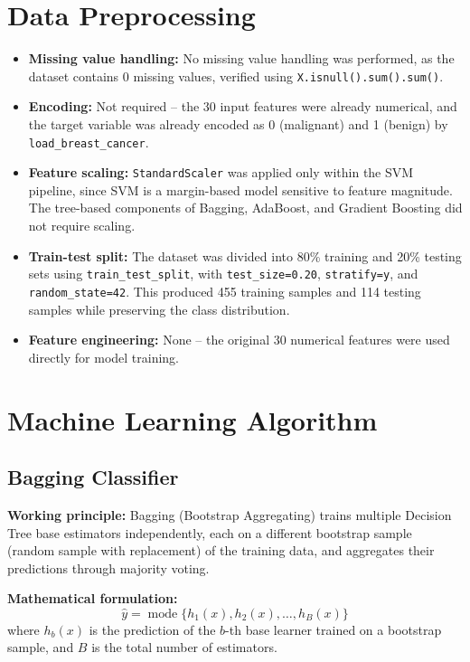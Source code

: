\documentclass[12pt,a4paper]{article}
\begin{document}
\section{Data Preprocessing}
\begin{itemize}
\item \textbf{Missing value handling:} No missing value handling was performed, as the dataset contains 0 missing values, verified using \texttt{X.isnull().sum().sum()}.

\item \textbf{Encoding:} Not required -- the 30 input features were already numerical, and the target variable was already encoded as 0 (malignant) and 1 (benign) by \texttt{load\_breast\_cancer}.

\item \textbf{Feature scaling:} \texttt{StandardScaler} was applied only within the SVM pipeline, since SVM is a margin-based model sensitive to feature magnitude. The tree-based components of Bagging, AdaBoost, and Gradient Boosting did not require scaling.

\item \textbf{Train-test split:} The dataset was divided into 80\% training and 20\% testing sets using \texttt{train\_test\_split}, with \texttt{test\_size=0.20}, \texttt{stratify=y}, and \texttt{random\_state=42}. This produced 455 training samples and 114 testing samples while preserving the class distribution.

\item \textbf{Feature engineering:} None -- the original 30 numerical features were used directly for model training.
\end{itemize}

\section{Machine Learning Algorithm}

\subsection*{Bagging Classifier}
\textbf{Working principle:} Bagging (Bootstrap Aggregating) trains multiple Decision Tree base estimators independently, each on a different bootstrap sample (random sample with replacement) of the training data, and aggregates their predictions through majority voting.

\textbf{Mathematical formulation:}
\[
\hat{y} = \operatorname{mode}\{h_1(x), h_2(x), \ldots, h_B(x)\}
\]
where $h_b(x)$ is the prediction of the $b$-th base learner trained on a bootstrap sample, and $B$ is the total number of estimators.
\end{document}
